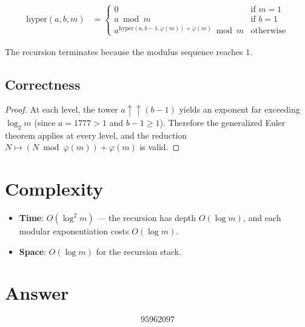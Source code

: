 \documentclass[12pt]{article}
\begin{document}
\begin{align}
\text{hyper}(a, b, m) &= \begin{cases}
0 & \text{if } m = 1 \\
a \bmod m & \text{if } b = 1 \\
a^{\text{hyper}(a, b-1, \varphi(m)) + \varphi(m)} \bmod m & \text{otherwise}
\end{cases}
\end{align}

The recursion terminates because the modulus sequence reaches 1.

\subsection{Correctness}

\begin{proof}
At each level, the tower $a \uparrow\uparrow (b-1)$ yields an exponent far exceeding $\log_2 m$ (since $a = 1777 > 1$ and $b - 1 \ge 1$). Therefore the generalized Euler theorem applies at every level, and the reduction $N \mapsto (N \bmod \varphi(m)) + \varphi(m)$ is valid.
\end{proof}

\section{Complexity}

\begin{itemize}
    \item \textbf{Time}: $O(\log^2 m)$ --- the recursion has depth $O(\log m)$, and each modular exponentiation costs $O(\log m)$.
    \item \textbf{Space}: $O(\log m)$ for the recursion stack.
\end{itemize}

\section{Answer}

\[
\boxed{95962097}
\]
\end{document}
